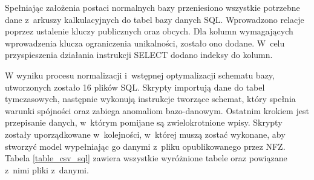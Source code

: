 Spełniając założenia postaci normalnych bazy przeniesiono wszystkie potrzebne dane z~arkuszy kalkulacyjnych do tabel bazy danych SQL. Wprowadzono relacje poprzez ustalenie kluczy publicznych oraz obcych. Dla kolumn wymagających wprowadzenia klucza ograniczenia unikalności, zostało ono dodane. W~celu przyspieszenia działania instrukcji SELECT dodano indeksy do kolumn.
 
W wyniku procesu normalizacji i~wstępnej optymalizacji schematu bazy, utworzonych zostało 16 plików SQL. Skrypty importują dane do tabel tymczasowych, następnie wykonują instrukcje tworzące schemat, który spełnia warunki spójności oraz zabiega anomaliom bazo-danowym. Ostatnim krokiem jest przepisanie danych, w~którym pomijane są zwielokrotnione wpisy. Skrypty zostały uporządkowane w~kolejności, w~której muszą zostać wykonane, aby stworzyć model wypełniając go danymi z~pliku opublikowanego przez NFZ. Tabela \ref{table_csv_sql} zawiera wszystkie wyróżnione tabele oraz powiązane z~nimi pliki z~danymi.

